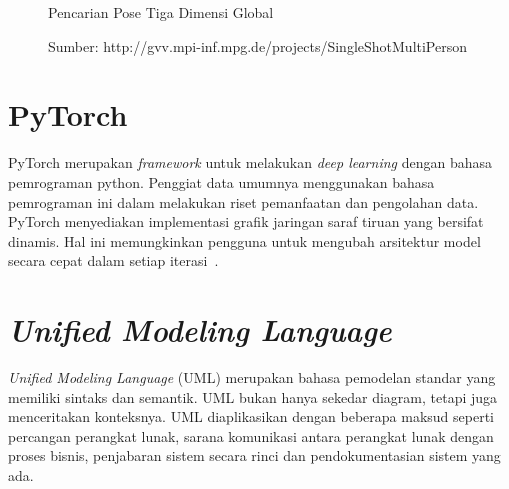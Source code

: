 \begin{figure}[htbp]
    \begin{center}
    \end{center}
    \vspace{-20pt}
    \captionsetup{labelfont=bf, textfont=bf}
    \caption{Pencarian Pose Tiga Dimensi Global}
    \vspace{-10pt}
    \captionsetup{labelfont=md, textfont=md}
    \caption*{Sumber: http://gvv.mpi-inf.mpg.de/projects/SingleShotMultiPerson}
    \label{fig:global}
\end{figure}

\section{PyTorch}
\label{sec:2-PyTorch}

PyTorch merupakan \textit{framework} untuk melakukan \textit{deep learning} dengan bahasa pemrograman
python. Penggiat data umumnya menggunakan bahasa pemrograman ini dalam melakukan
riset pemanfaatan dan pengolahan data. PyTorch menyediakan implementasi grafik jaringan saraf tiruan yang bersifat dinamis.
Hal ini memungkinkan pengguna untuk mengubah arsitektur model secara cepat dalam setiap iterasi~\cite{2019arXiv191201703P}.


\section{\textit{Unified Modeling Language}}
\label{sec:2-uml}

\textit{Unified Modeling Language} (UML) merupakan bahasa pemodelan standar yang memiliki sintaks
dan semantik. UML bukan hanya sekedar diagram, tetapi juga menceritakan konteksnya. UML
diaplikasikan dengan beberapa maksud seperti percangan perangkat lunak, sarana komunikasi antara
perangkat lunak dengan proses bisnis, penjabaran sistem secara rinci dan pendokumentasian sistem
yang ada.

